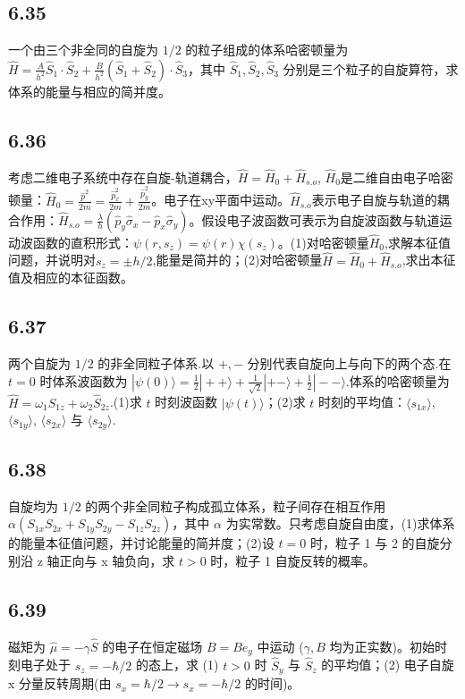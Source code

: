 \subsection{6.35}
一个由三个非全同的自旋为 $1/2$ 的粒子组成的体系哈密顿量为 $\hat{H} = \frac{A}{h^2}\hat{S}_1 \cdot \hat{S}_2 + \frac{B}{h^2}(\hat{S}_1 + \hat{S}_2) \cdot \hat{S}_3$，其中 $\hat{S}_1, \hat{S}_2, \hat{S}_3$ 分别是三个粒子的自旋算符，求体系的能量与相应的简并度。

\subsection{6.36}
考虑二维电子系统中存在自旋-轨道耦合，$\hat{H}=\hat{H}_0+\hat{H}_{s.o}$, $\hat{H}_0$是二维自由电子哈密顿量：$\hat{H}_0=\frac{\hat{p}^2}{2m}=\frac{\hat{p}_x^2}{2m}+\frac{\hat{p}_y^2}{2m}$。电子在xy平面中运动。$\hat{H}_{s.o}$表示电子自旋与轨道的耦合作用：$\hat{H}_{s.o}=\frac{\lambda}{h}(\hat{p}_y\hat{\sigma}_x-\hat{p}_x\hat{\sigma}_y)$。假设电子波函数可表示为自旋波函数与轨道运动波函数的直积形式：$\psi(r,s_z)=\psi(r)\chi(s_z)$。(1)对哈密顿量$\hat{H}_0$,求解本征值问题，并说明对$s_z=\pm h/2$,能量是简并的；(2)对哈密顿量$\hat{H}=\hat{H}_0+\hat{H}_{s.o}$,求出本征值及相应的本征函数。

\subsection{6.37}
两个自旋为 $1/2$ 的非全同粒子体系.以 $+,-$ 分别代表自旋向上与向下的两个态.在 $t=0$ 时体系波函数为 $|\psi(0)\rangle = \frac{1}{2}|++\rangle + \frac{1}{\sqrt{2}}|+-\rangle + \frac{1}{2}|--\rangle$.体系的哈密顿量为 $\hat{H} = \omega_1 \hat{S}_{1z} + \omega_2 \hat{S}_{2z}$.(1)求 $t$ 时刻波函数 $|\psi(t)\rangle$；(2)求 $t$ 时刻的平均值：$\langle s_{1x}\rangle$, $\langle s_{1y}\rangle$, $\langle s_{2x}\rangle$ 与 $\langle s_{2y}\rangle$.

\subsection{6.38}
自旋均为 $1/2$ 的两个非全同粒子构成孤立体系，粒子间存在相互作用 $\alpha (S_{1x} S_{2x} + S_{1y} S_{2y} - S_{1z} S_{2z})$，其中 $\alpha$ 为实常数。只考虑自旋自由度，(1)求体系的能量本征值问题，并讨论能量的简并度；(2)设 $t=0$ 时，粒子 1 与 2 的自旋分别沿 z 轴正向与 x 轴负向，求 $t>0$ 时，粒子 1 自旋反转的概率。

\subsection{6.39}
磁矩为 $\hat{\mu} = -\gamma \hat{S}$ 的电子在恒定磁场 $B = Be_y$ 中运动 ($\gamma, B$ 均为正实数)。初始时刻电子处于 $s_z = -\hbar / 2$ 的态上，求 (1) $t > 0$ 时 $\hat{S}_y$ 与 $\hat{S}_z$ 的平均值；(2) 电子自旋 x 分量反转周期(由 $s_x = \hbar / 2 \rightarrow s_x = -\hbar / 2$ 的时间)。

